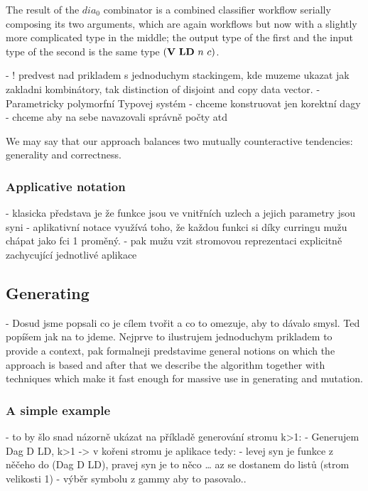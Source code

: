 \documentclass[a4paper,oneside]{memoir}
\begin{document}
The result of the $dia_0$ combinator is a combined classifier workflow serially composing its two arguments, 
which are again workflows but now with a slightly more complicated type in the middle; 
the output type of the first and the input type of the second is the same type $(\textbf{V}\ \textbf{LD}\ n\ c)$. 




- ! predvest nad prikladem s jednoduchym stackingem, kde muzeme ukazat jak zakladni kombinátory, tak distinction of disjoint and copy data vector.
- Parametricky polymorfní Typovej systém
- chceme konstruovat jen korektní dagy
- chceme aby na sebe navazovali správně počty atd

We may say that our approach balances two mutually counteractive tendencies: generality and correctness.


\subsubsection{Applicative notation}

- klasicka představa je že funkce jsou ve vnitřních uzlech a jejich parametry jsou syni
- aplikativní notace využívá toho, že každou funkci si díky curringu mužu chápat jako fci 1 proměný. 
- pak mužu vzit stromovou reprezentaci explicitně zachycující jednotlivé aplikace

\subsection{Generating}

- Dosud jsme popsali co je cílem tvořit a co to omezuje, aby to dávalo smysl. Ted popíšem jak na to jdeme. Nejprve to ilustrujem jednoduchym prikladem to provide a context, pak formalneji predstavime general notions on which the approach is based and after that we describe the algorithm together with techniques which make it fast enough for massive use in generating and mutation.

\subsubsection{A simple example}

- to by šlo snad názorně ukázat na příkladě generování stromu k>1:
- Generujem Dag D LD, k>1 -> v kořeni stromu je aplikace tedy:
- levej syn je funkce z něčeho do (Dag D LD), pravej syn je to něco
… az se dostanem do listů (strom velikosti 1) - výběr symbolu z gammy aby to pasovalo..
\end{document}
